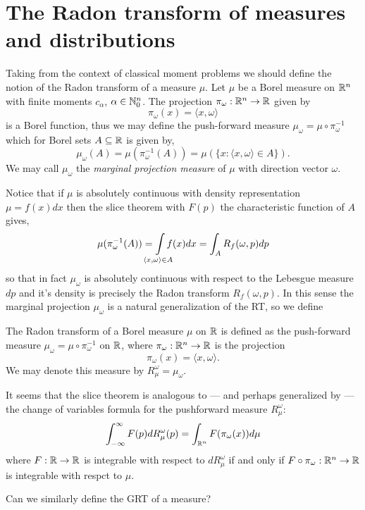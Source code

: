 
\section{The Radon transform of measures and distributions}


Taking from the context of classical moment problems we should define the notion of the Radon transform of a measure $\mu$. Let $\mu$ be a Borel measure on $\mathbb{R}^n$ with finite moments $c_\alpha$, $\alpha \in \mathbb{N}_0^n$. The projection $\pi_\omega : \mathbb{R}^n \rightarrow \mathbb{R}$ given by
\[
  \pi_\omega(x) = \langle x, \omega \rangle
\] 
is a Borel function, thus we may define the push-forward measure $\mu_\omega = \mu \circ \pi_\omega^{-1}$ which for Borel sets $A \subseteq \mathbb{R}$ is given by,
\[
  \mu_\omega(A) = \mu(\pi_\omega^{-1}(A)) = \mu(\{x : \langle x, \omega \rangle \in A\}).
\]
We may call $\mu_\omega$ the \emph{marginal projection measure} of $\mu$ with direction vector $\omega$.

Notice that if $\mu$ is absolutely continuous with density representation $\mu = f(x)dx$ then the slice theorem with $F(p)$ the characteristic function of $A$ gives,
\[
  \mu(\pi_\omega^{-1}(A)) = \int\mclimits_{\langle x, \omega \rangle \in A} f(x)dx = \int_A R_f(\omega, p) dp
\]
so that in fact $\mu_\omega$ is absolutely continuous with respect to the Lebesgue measure $dp$ and it's density is precisely the Radon transform $R_f(\omega, p)$. In this sense the marginal projection $\mu_\omega$ is a natural generalization of the RT, so we define

\begin{definition}
  The Radon transform of a Borel measure $\mu$ on $\mathbb{R}$ is defined as the push-forward measure $\mu_\omega = \mu \circ \pi_\omega^{-1}$ on $\mathbb{R}$, where $\pi_\omega: \mathbb{R}^n \rightarrow \mathbb{R}$ is the projection 
  \[
    \pi_\omega(x) = \langle x, \omega \rangle.
  \]
  We may denote this measure by $R_\mu^\omega = \mu_\omega$.
\end{definition}

\begin{remark}
  It seems that the slice theorem is analogous to — and perhaps generalized by — the change of variables formula for the pushforward measure $R^\omega_\mu$:
  \[
    \int_{-\infty}^\infty F(p) dR^\omega_\mu(p) = \int_{\mathbb{R}^n} F(\pi_\omega(x)) d\mu
  \]
  where $F:\mathbb{R} \rightarrow \mathbb{R}$ is integrable with respect to $dR^\omega_\mu$ if and only if $F\circ\pi_\omega : \mathbb{R}^n \rightarrow \mathbb{R}$ is integrable with respct to $\mu$.
\end{remark}
Can we similarly define the GRT of a measure?

